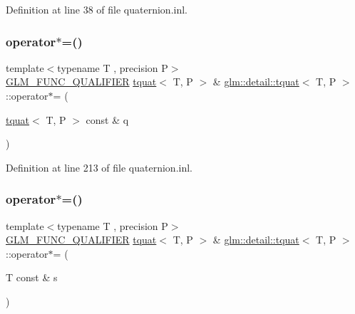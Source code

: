 Definition at line 38 of file quaternion.\+inl.

\mbox{\label{structglm_1_1detail_1_1tquat_a243cc89ef80ff3d0a9fd85fc3038587e}} 
\subsubsection{\texorpdfstring{operator$\ast$=()}{operator*=()}\hspace{0.1cm}{\footnotesize\ttfamily [1/2]}}
{\footnotesize\ttfamily template$<$typename T , precision P$>$ \\
\hyperlink{setup_8hpp_a33fdea6f91c5f834105f7415e2a64407}{G\+L\+M\+\_\+\+F\+U\+N\+C\+\_\+\+Q\+U\+A\+L\+I\+F\+I\+ER} \hyperlink{structglm_1_1detail_1_1tquat}{tquat}$<$ T, P $>$ \& \hyperlink{structglm_1_1detail_1_1tquat}{glm\+::detail\+::tquat}$<$ T, P $>$\+::operator$\ast$= (\begin{DoxyParamCaption}\item[{\hyperlink{structglm_1_1detail_1_1tquat}{tquat}$<$ T, P $>$ const \&}]{q }\end{DoxyParamCaption})}



Definition at line 213 of file quaternion.\+inl.

\mbox{\label{structglm_1_1detail_1_1tquat_a65a23d874bc35ecade85c50bf5425a90}} 
\subsubsection{\texorpdfstring{operator$\ast$=()}{operator*=()}\hspace{0.1cm}{\footnotesize\ttfamily [2/2]}}
{\footnotesize\ttfamily template$<$typename T , precision P$>$ \\
\hyperlink{setup_8hpp_a33fdea6f91c5f834105f7415e2a64407}{G\+L\+M\+\_\+\+F\+U\+N\+C\+\_\+\+Q\+U\+A\+L\+I\+F\+I\+ER} \hyperlink{structglm_1_1detail_1_1tquat}{tquat}$<$ T, P $>$ \& \hyperlink{structglm_1_1detail_1_1tquat}{glm\+::detail\+::tquat}$<$ T, P $>$\+::operator$\ast$= (\begin{DoxyParamCaption}\item[{T const \&}]{s }\end{DoxyParamCaption})}



